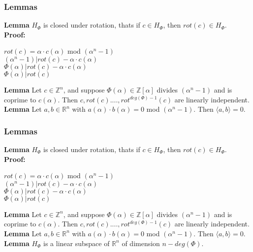 \documentclass{beamer}
\begin{document}
\begin{frame}
	\frametitle{Lemmas}
	\textbf{Lemma} $H_\Phi$ is closed under rotation, thats if $c \in H_\Phi$, then $rot(c) \in H_\Phi$.
	\\
	\textbf{Proof:}
	\\
	{
		\centering
		$rot(c) = \alpha \cdot c(\alpha)$ mod $(\alpha^n - 1)$
		\\
		$(\alpha^n-1) | rot(c) - \alpha \cdot c(\alpha)$
		\\
		$\Phi(\alpha) | rot(c) - \alpha \cdot c(\alpha)$
		\\
		$\Phi(\alpha) | rot(c)$\par
	}
	\textbf{Lemma} Let $c \in \mathbb{Z}^n$, and suppose $\Phi(\alpha) \in \mathbb{Z}[\alpha]$ divides $(\alpha^n-1)$ and is coprime to $c(\alpha)$. Then $c, rot(c)....,rot^{deg(\Phi)-1}(c)$ are linearly independent.
	\\
	\textbf{Lemma} Let $a,b \in \mathbb{R}^n$ with $a(\alpha) \cdot b(\alpha) = 0$ mod $(\alpha^n-1)$. Then $\langle a,b \rangle = 0$.
\end{frame}
\begin{frame}
	\frametitle{Lemmas}
	\textbf{Lemma} $H_\Phi$ is closed under rotation, thats if $c \in H_\Phi$, then $rot(c) \in H_\Phi$.
	\\
	\textbf{Proof:}
	\\
	{
		\centering
		$rot(c) = \alpha \cdot c(\alpha)$ mod $(\alpha^n - 1)$
		\\
		$(\alpha^n-1) | rot(c) - \alpha \cdot c(\alpha)$
		\\
		$\Phi(\alpha) | rot(c) - \alpha \cdot c(\alpha)$
		\\
		$\Phi(\alpha) | rot(c)$\par
	}
	\textbf{Lemma} Let $c \in \mathbb{Z}^n$, and suppose $\Phi(\alpha) \in \mathbb{Z}[\alpha]$ divides $(\alpha^n-1)$ and is coprime to $c(\alpha)$. Then $c, rot(c)....,rot^{deg(\Phi)-1}(c)$ are linearly independent.
	\\
	\textbf{Lemma} Let $a,b \in \mathbb{R}^n$ with $a(\alpha) \cdot b(\alpha) = 0$ mod $(\alpha^n-1)$. Then $\langle a,b \rangle = 0$.
	\\
	\textbf{Lemma} $H_\Phi$ is a linear subspace of $\mathbb{R}^n$ of dimension $n - deg(\Phi)$.
\end{frame}
\end{document}
